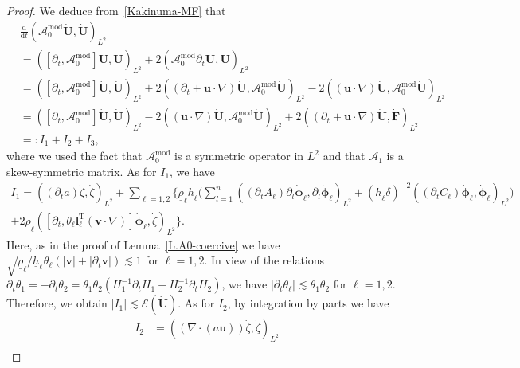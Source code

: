 \documentclass[11pt,leqno]{article}
\numberwithin{equation}{section}
\numberwithin{figure}{section}
\begin{document}
\begin{proof}
We deduce from~\eqref{Kakinuma-MF} that 
%
\begin{align*}
&\frac{\mathrm{d}}{\mathrm{d}t}(\mathscr{A}_0^\mathrm{mod}\dot{\bm{U}},\dot{\bm{U}})_{L^2} \\
&= ([\partial_t,\mathscr{A}_0^\mathrm{mod}]\dot{\bm{U}},\dot{\bm{U}})_{L^2}
 + 2(\mathscr{A}_0^\mathrm{mod}\partial_t\dot{\bm{U}},\dot{\bm{U}})_{L^2} \\
&= ([\partial_t,\mathscr{A}_0^\mathrm{mod}]\dot{\bm{U}},\dot{\bm{U}})_{L^2}
 + 2((\partial_t+\bm{u}\cdot\nabla)\dot{\bm{U}},\mathscr{A}_0^\mathrm{mod}\dot{\bm{U}})_{L^2}
 - 2((\bm{u}\cdot\nabla)\dot{\bm{U}},\mathscr{A}_0^\mathrm{mod}\dot{\bm{U}})_{L^2} \\
&= ([\partial_t,\mathscr{A}_0^\mathrm{mod}]\dot{\bm{U}},\dot{\bm{U}})_{L^2}
 - 2((\bm{u}\cdot\nabla)\dot{\bm{U}},\mathscr{A}_0^\mathrm{mod}\dot{\bm{U}})_{L^2}
 + 2((\partial_t+\bm{u}\cdot\nabla)\dot{\bm{U}},\dot{\bm{F}})_{L^2} \\
&=: I_1+I_2+I_3,
\end{align*}
%
where we used the fact that $\mathscr{A}_0^\mathrm{mod}$ is a symmetric operator in $L^2$ and that $\mathscr{A}_1$ 
is a skew-symmetric matrix. 
As for $I_1$, we have 
%
\begin{align*}
I_1 = ((\partial_t a)\dot{\zeta},\dot{\zeta})_{L^2}
 + \sum_{\ell=1,2} \biggl\{ \underline{\rho}_\ell\underline{h}_\ell \biggl(
  \sum_{l=1}^n((\partial_t A_\ell)\partial_l\dot{\bm{\phi}}_\ell,\partial_l\dot{\bm{\phi}}_\ell)_{L^2}
   + (\underline{h}_\ell\delta)^{-2}((\partial_t C_\ell)\dot{\bm{\phi}}_\ell,\dot{\bm{\phi}}_\ell)_{L^2} \biggr) \\
 + 2\underline{\rho}_\ell([\partial_t, \theta_\ell\bm{l}_\ell^\mathrm{T}(\bm{v}\cdot\nabla)]\dot{\bm{\phi}}_\ell, \dot{\zeta})_{L^2}
 \biggr\}.
\end{align*}
%
Here, as in the proof of Lemma~\ref{L.A0-coercive} we have 
$\sqrt{\underline{\rho}_\ell/\underline{h}_\ell}\theta_\ell(|\bm{v}|+|\partial_t \bm{v}|) \lesssim 1$ for $\ell=1,2$. 
In view of the relations $\partial_t\theta_1=-\partial_t\theta_2=\theta_1\theta_2(H_1^{-1}\partial_t H_1 - H_2^{-1}\partial_t H_2)$, 
we have $|\partial_t\theta_\ell| \lesssim \theta_1\theta_2$ for $\ell=1,2$. 
Therefore, we obtain $|I_1| \lesssim \mathscr{E}(\dot{\bm{U}})$. 
As for $I_2$, by integration by parts we have 
%
\begin{align*}
I_2 &= ((\nabla\cdot(a\bm{u}))\dot{\zeta},\dot{\zeta})_{L^2} \\
&\quad\;

\end{align*}
\end{proof}
\end{document}
